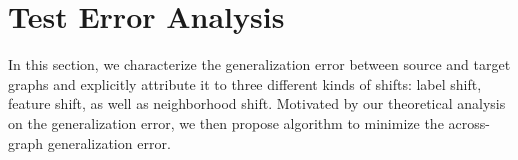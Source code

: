 \section{Test Error Analysis}
\label{Sec:Test Error Analysis}

In this section, we characterize the generalization error between source and target graphs and explicitly attribute it to three different kinds of shifts: label shift, feature shift, as well as neighborhood shift. Motivated by our theoretical analysis on the generalization error, we then propose \proj algorithm to minimize the across-graph generalization error. 

